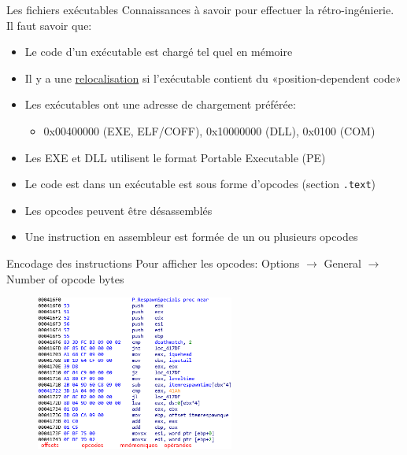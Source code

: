 \documentclass[10pt,xcolor={table,dvipsnames},t]{beamer}
\begin{document}
\begin{frame}{Les fichiers exécutables}
    Connaissances à savoir pour effectuer la rétro-ingénierie. Il faut savoir que:
    \begin{itemize}
        \item Le code d'un exécutable est chargé tel quel en mémoire
        \item Il y a une \href{https://en.wikipedia.org/wiki/Relocation_(computing)}{relocalisation} si l'exécutable contient du «position-dependent code»
        \item Les exécutables ont une adresse de chargement préférée: 
        \begin{itemize}
            \item 0x00400000 (EXE, ELF/COFF), 0x10000000 (DLL), 0x0100 (COM)
        \end{itemize}
        \item Les EXE et DLL utilisent le format Portable Executable (PE) %
        \item Le code est dans un exécutable est sous forme d'opcodes (section \texttt{.text})
        \item Les opcodes peuvent être désassemblés
        \item Une instruction en assembleur est formée de un ou plusieurs opcodes
    \end{itemize}
\end{frame}

\begin{frame}{Encodage des instructions}
    Pour afficher les opcodes: Options $\rightarrow$ General $\rightarrow$ Number of opcode bytes
    \begin{figure}%
        \includegraphics[width=0.58\textwidth]{Opcodes}
    \end{figure}

\end{frame}
\end{document}
